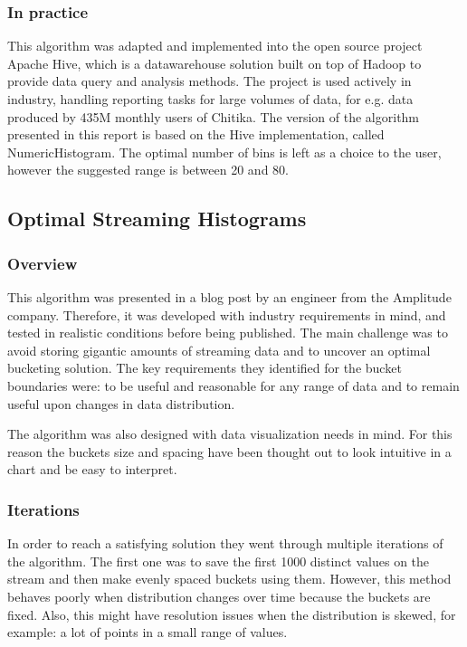 \documentclass[12pt]{article}
\begin{document}
	\subsubsection{In practice}
	This algorithm was adapted and implemented into the open source project Apache 
	Hive\cite{Thusoo:2009:HWS:1687553.1687609}, which is a datawarehouse solution 
	built on top of Hadoop to provide data query and analysis methods. The project 
	is used actively in industry, handling reporting tasks for large volumes of data,
	for e.g. data produced by 435M monthly users of Chitika\cite{HivePoweredBy}.
	The version of the algorithm presented in this report is based on the Hive 
	implementation, called NumericHistogram\cite{HiveImplementation}. The optimal 
	number of bins is left as a choice to the user, however the suggested range 
	is between 20 and 80.


	\subsection{Optimal Streaming Histograms}
	\subsubsection{Overview}
	This algorithm was presented in a blog post\cite{OSHistograms} 
	by an engineer from the Amplitude company. Therefore, it was developed 
	with industry requirements in mind, and tested in realistic conditions 
	before being published. The main challenge was to avoid storing gigantic 
	amounts of streaming data and to uncover an optimal bucketing solution.
	The key requirements they identified for the bucket boundaries were:
	to be useful and reasonable for any range of data and to remain 
	useful upon changes in data distribution.
	
	The algorithm was also designed with data visualization needs in mind. 
	For this reason the buckets size and spacing have been thought out to 
	look intuitive in a chart and be easy to interpret.

	\subsubsection{Iterations}
	In order to reach a satisfying solution they went through multiple iterations 
	of the algorithm. The first one was to save the first 1000 distinct values 
	on the stream and then make evenly spaced buckets using them. However, this 
	method behaves poorly when distribution changes over time because the buckets 
	are fixed. Also, this might have resolution issues when the distribution 
	is skewed, for example: a lot of points in a small range of values. 
	
\end{document}
